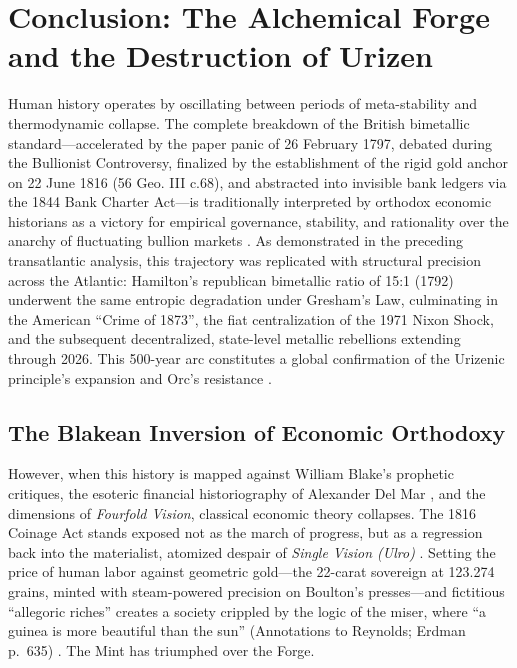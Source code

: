 \documentclass[
]{article}
\begin{document}
\newpage

\section{Conclusion: The Alchemical Forge and the Destruction of
Urizen}\label{conclusion-the-alchemical-forge-and-the-destruction-of-urizen}

Human history operates by oscillating between periods of meta-stability
and thermodynamic collapse. The complete breakdown of the British
bimetallic standard---accelerated by the paper panic of 26 February
1797, debated during the Bullionist Controversy, finalized by the
establishment of the rigid gold anchor on 22 June 1816 (56 Geo. III
c.68), and abstracted into invisible bank ledgers via the 1844 Bank
Charter Act---is traditionally interpreted by orthodox economic
historians as a victory for empirical governance, stability, and
rationality over the anarchy of fluctuating bullion markets
\citep{fetter1965development}. As demonstrated in the preceding
transatlantic analysis, this trajectory was replicated with structural
precision across the Atlantic: Hamilton's republican bimetallic ratio of
15:1 (1792) underwent the same entropic degradation under Gresham's Law,
culminating in the American ``Crime of 1873'', the fiat centralization
of the 1971 Nixon Shock, and the subsequent decentralized, state-level
metallic rebellions extending through 2026. This 500-year arc
constitutes a global confirmation of the Urizenic principle's expansion
and Orc's resistance \citep{laughlin1898bimetallism, blake1793america}.

\subsection{The Blakean Inversion of Economic
Orthodoxy}\label{the-blakean-inversion-of-economic-orthodoxy}

However, when this history is mapped against William Blake's prophetic
critiques, the esoteric financial historiography of Alexander Del Mar
\citep{delmar1895history}, and the dimensions of \emph{Fourfold Vision},
classical economic theory collapses. The 1816 Coinage Act stands exposed
not as the march of progress, but as a regression back into the
materialist, atomized despair of \emph{Single Vision (Ulro)}
\citep{redish1990evolution}. Setting the price of human labor against
geometric gold---the 22-carat sovereign at 123.274 grains, minted with
steam-powered precision on Boulton's presses---and fictitious
``allegoric riches'' creates a society crippled by the logic of the
miser, where ``a guinea is more beautiful than the sun'' (Annotations to
Reynolds; Erdman p.~635) \citep{blake1808annotations}. The Mint has
triumphed over the Forge.
\end{document}
